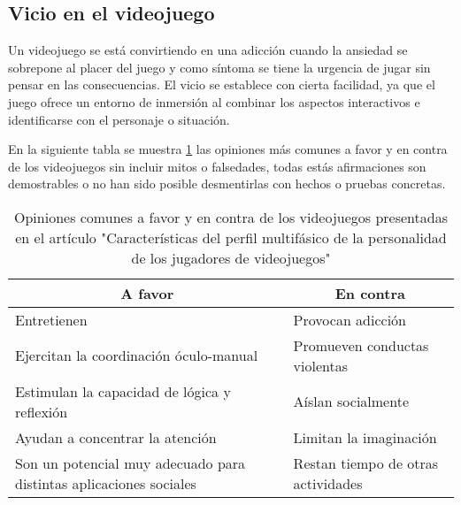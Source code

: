 \subsection{Vicio en el videojuego}\label{vicioVJ}
Un videojuego se está convirtiendo en una adicción cuando la ansiedad se sobrepone al placer del juego y como síntoma se tiene la urgencia de jugar sin pensar en las consecuencias. El vicio se establece con cierta facilidad, ya que el juego ofrece un entorno de inmersión al combinar los aspectos interactivos e identificarse con el personaje o situación.

En la siguiente tabla se muestra \ref{tab:tablaOpinión} las opiniones más comunes a favor y en contra de los videojuegos sin incluir mitos o falsedades, todas estás afirmaciones son demostrables o no han sido posible desmentirlas con hechos o pruebas concretas.
\begin{table}[]
	\centering
\caption{Opiniones comunes a favor y en contra de los videojuegos presentadas en el artículo "Características del perfil multifásico de la personalidad de los jugadores de videojuegos" \cite{quinteroscaracteristicas}}
\label{tab:tablaOpinión}
	\begin{tabular}{|l|l|}
		\hline
		\multicolumn{1}{|c|}{\textbf{A favor}}                             & \multicolumn{1}{c|}{\textbf{En contra}} \\ \hline
		Entretienen                                                        & Provocan adicción                       \\ \hline
		Ejercitan la coordinación óculo-manual                             & Promueven conductas violentas           \\ \hline
		Estimulan la capacidad de lógica y reflexión                       & Aíslan socialmente                      \\ \hline
		Ayudan a concentrar la atención                                    & Limitan la imaginación                  \\ \hline
		Son un potencial muy adecuado para distintas aplicaciones sociales & Restan tiempo de otras actividades      \\ \hline
	\end{tabular}
\end{table}

	
